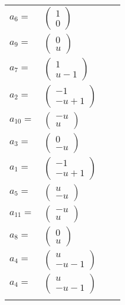\documentclass[1p]{elsarticle_modified}
\theoremstyle{definition}
\begin{document}
\begin{tabular}{m{7pt} m{180pt} m{7pt} m{180pt} }
\flushright $a_{6}=$&$\begin{pmatrix}1\\0\end{pmatrix}$ \\
\flushright $a_{9}=$&$\begin{pmatrix}0\\u\end{pmatrix}$ \\
\flushright $a_{7}=$&$\begin{pmatrix}1\\u-1\end{pmatrix}$ \\
\flushright $a_{2}=$&$\begin{pmatrix}-1\\- u+1\end{pmatrix}$ \\
\flushright $a_{10}=$&$\begin{pmatrix}- u\\u\end{pmatrix}$ \\
\flushright $a_{3}=$&$\begin{pmatrix}0\\- u\end{pmatrix}$ \\
\flushright $a_{1}=$&$\begin{pmatrix}-1\\- u+1\end{pmatrix}$ \\
\flushright $a_{5}=$&$\begin{pmatrix}u\\- u\end{pmatrix}$ \\
\flushright $a_{11}=$&$\begin{pmatrix}- u\\u\end{pmatrix}$ \\
\flushright $a_{8}=$&$\begin{pmatrix}0\\u\end{pmatrix}$ \\
\flushright $a_{4}=$&$\begin{pmatrix}u\\- u-1\end{pmatrix}$\\ \flushright $a_{4}=$&$\begin{pmatrix}u\\- u-1\end{pmatrix}$\\&\end{tabular}
\end{document}
